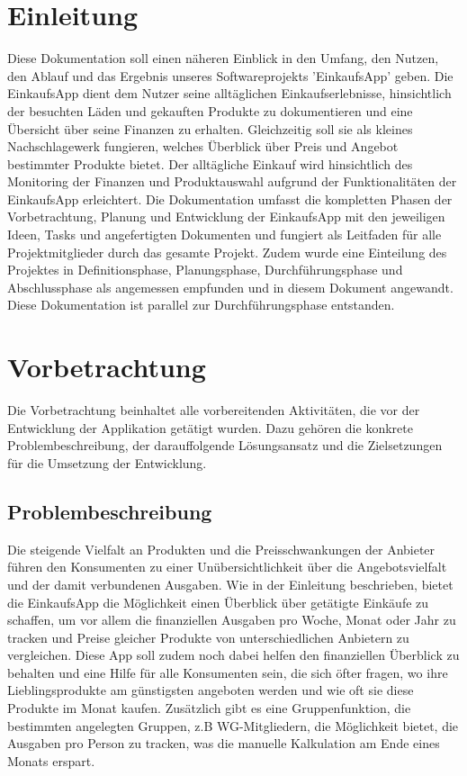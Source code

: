 \documentclass[12pt,a4paper]{article}
\begin{document}
\section*{Einleitung}
Diese Dokumentation soll einen näheren Einblick in den Umfang, den Nutzen, den Ablauf und das Ergebnis unseres Softwareprojekts 'EinkaufsApp' geben.  
\newline
Die EinkaufsApp dient dem Nutzer seine alltäglichen Einkaufserlebnisse, hinsichtlich der besuchten Läden und gekauften Produkte zu dokumentieren und eine Übersicht über seine Finanzen zu erhalten.
Gleichzeitig soll sie als kleines Nachschlagewerk fungieren, welches Überblick über Preis und Angebot bestimmter Produkte bietet.
Der alltägliche Einkauf wird hinsichtlich des Monitoring der Finanzen und Produktauswahl aufgrund der Funktionalitäten der EinkaufsApp erleichtert.
\newline
Die Dokumentation umfasst die kompletten Phasen der Vorbetrachtung, Planung und Entwicklung der EinkaufsApp mit den jeweiligen Ideen, Tasks und angefertigten Dokumenten und fungiert als Leitfaden für alle Projektmitglieder durch das gesamte Projekt.
\newline
Zudem wurde eine Einteilung des Projektes in Definitionsphase, Planungsphase, Durchführungsphase und Abschlussphase als angemessen empfunden und in diesem Dokument angewandt.
Diese Dokumentation ist parallel zur Durchführungsphase entstanden.

\newpage
\section{Vorbetrachtung}
Die Vorbetrachtung beinhaltet alle vorbereitenden Aktivitäten, die vor der Entwicklung der Applikation getätigt wurden. Dazu gehören die konkrete Problembeschreibung, der darauffolgende Lösungsansatz und die Zielsetzungen für die Umsetzung der Entwicklung.


\subsection{Problembeschreibung}
Die steigende Vielfalt an Produkten und die Preisschwankungen der Anbieter führen den Konsumenten zu einer Unübersichtlichkeit über die Angebotsvielfalt und der damit verbundenen Ausgaben.
Wie in der Einleitung beschrieben, bietet die EinkaufsApp die Möglichkeit einen Überblick über getätigte Einkäufe zu schaffen,
um vor allem die finanziellen Ausgaben pro Woche, Monat oder Jahr zu tracken und Preise gleicher Produkte von unterschiedlichen Anbietern zu vergleichen.  
Diese App soll zudem noch dabei helfen den finanziellen Überblick zu behalten und eine Hilfe für alle Konsumenten sein, die sich öfter fragen, wo ihre Lieblingsprodukte am günstigsten angeboten werden und wie oft sie diese Produkte im Monat kaufen.
Zusätzlich gibt es eine Gruppenfunktion, die bestimmten angelegten Gruppen, z.B WG-Mitgliedern, die Möglichkeit bietet, die Ausgaben pro Person zu tracken, was die manuelle Kalkulation am Ende eines Monats erspart. 
\end{document}
